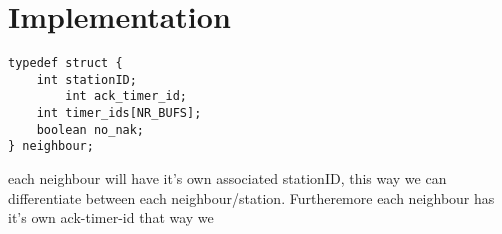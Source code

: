 \section{Implementation}



\begin{lstlisting}
typedef struct {
    int stationID;
		int ack_timer_id;
    int timer_ids[NR_BUFS];
    boolean no_nak;
} neighbour;
\end{lstlisting}

each neighbour will have it's own associated stationID,
this way we can differentiate between each neighbour/station.
Furtheremore each neighbour has it's own ack-timer-id that way we 
